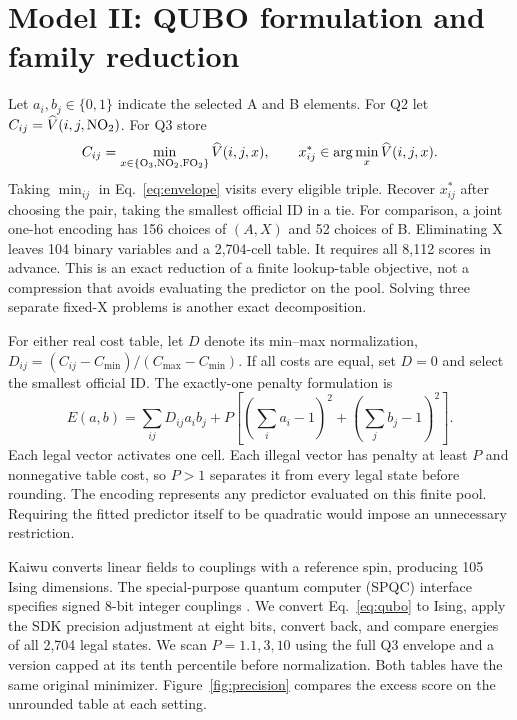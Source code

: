 \section{Model II: QUBO formulation and family reduction}
Let $a_i,b_j\in\{0,1\}$ indicate the selected A and B elements. For Q2 let $C_{ij}=\widehat V(i,j,\mathrm{NO}_2)$. For Q3 store
\begin{equation}
 C_{ij}=\min_{x\in\{\mathrm O_3,\mathrm{NO}_2,\mathrm{FO}_2\}}\widehat V(i,j,x),
 \qquad x^*_{ij}\in\arg\min_x\widehat V(i,j,x).
 \label{eq:envelope}
\end{equation}
Taking $\min_{ij}$ in Eq.~\eqref{eq:envelope} visits every eligible triple. Recover $x^*_{ij}$ after choosing the pair, taking the smallest official ID in a tie. For comparison, a joint one-hot encoding has 156 choices of $(A,X)$ and 52 choices of B. Eliminating X leaves 104 binary variables and a 2,704-cell table. It requires all 8,112 scores in advance. This is an exact reduction of a finite lookup-table objective, not a compression that avoids evaluating the predictor on the pool. Solving three separate fixed-X problems is another exact decomposition.

For either real cost table, let $D$ denote its min--max normalization, $D_{ij}=(C_{ij}-C_{\min})/(C_{\max}-C_{\min})$. If all costs are equal, set $D=0$ and select the smallest official ID. The exactly-one penalty formulation \cite{lucas} is
\begin{equation}
 E(a,b)=\sum_{ij} D_{ij}a_i b_j+
 P\left[\left(\sum_i a_i-1\right)^2+\left(\sum_j b_j-1\right)^2\right].
 \label{eq:qubo}
\end{equation}
Each legal vector activates one cell. Each illegal vector has penalty at least $P$ and nonnegative table cost, so $P>1$ separates it from every legal state before rounding. The encoding represents any predictor evaluated on this finite pool. Requiring the fitted predictor itself to be quadratic would impose an unnecessary restriction.

Kaiwu converts linear fields to couplings with a reference spin, producing 105 Ising dimensions. The special-purpose quantum computer (SPQC) interface specifies signed 8-bit integer couplings \cite{sdk}. We convert Eq.~\eqref{eq:qubo} to Ising, apply the SDK precision adjustment at eight bits, convert back, and compare energies of all 2,704 legal states. We scan $P=1.1,3,10$ using the full Q3 envelope and a version capped at its tenth percentile before normalization. Both tables have the same original minimizer. Figure~\ref{fig:precision} compares the excess score on the unrounded table at each setting.

